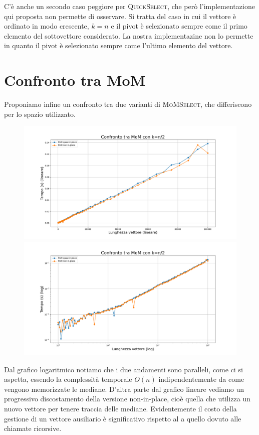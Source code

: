 \documentclass[a4paper,12pt]{article}
\newcommand{\QuickSelect}{\textsc{QuickSelect}}
\newcommand{\MoMSelect}{\textsc{MoMSelect}}
\begin{document}
C'è anche un secondo caso peggiore per \QuickSelect{}, che però l'implementazione qui proposta non permette di osservare.
Si tratta del caso in cui il vettore è ordinato in modo crescente, $k=n$ e il pivot è selezionato sempre come il primo elemento del sottovettore considerato.
La nostra implementazine non lo permette in quanto il pivot è selezionato sempre come l'ultimo elemento del vettore.



\section{Confronto tra MoM}
\label{sec:confronto-mom}
Proponiamo infine un confronto tra due varianti di \MoMSelect{}, che differiscono per lo spazio utilizzato.

\begin{figure}[h]
    \centering
    \includegraphics[width=.83\textwidth]{graphs/MoMs_n.png}
    \includegraphics[width=.83\textwidth]{graphs/MoMs_2xlog.png}
\end{figure}

Dal grafico logaritmico notiamo che i due andamenti sono paralleli, come ci si aspetta, essendo la complessità temporale  $O(n)$ indipendentemente da come vengono memorizzate le mediane.
D'altra parte dal grafico lineare vediamo un progressivo discostamento della versione non-in-place, cioè quella che utilizza un nuovo vettore per tenere traccia delle mediane.
Evidentemente il costo della gestione di un vettore ausiliario è significativo rispetto al a quello dovuto alle chiamate ricorsive.
\end{document}
